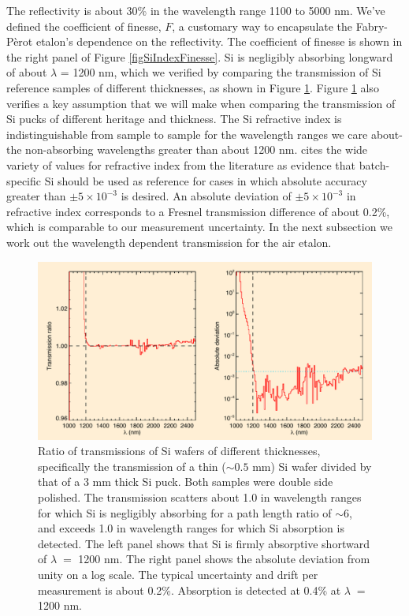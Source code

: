 \documentclass[osajnl,preprint,showpacs,superscriptaddress,12pt]{revtex4-1} %
\begin{document}
The reflectivity is about 30\% in the wavelength range 1100 to 5000 nm.  We've defined the coefficient of finesse\cite{2007fuph.book.....S}, $F$, a customary way to encapsulate the Fabry-P\`{e}rot etalon's dependence on the reflectivity.  The coefficient of finesse is shown in the right panel of Figure \ref{figSiIndexFinesse}.  Si is negligibly absorbing longward of about $\lambda$ = 1200 nm, which we verified by comparing the transmission of Si reference samples of different thicknesses, as shown in Figure \ref{figSiAbsorbfig}.  Figure \ref{figSiAbsorbfig} also verifies a key assumption that we will make when comparing the transmission of Si pucks of different heritage and thickness.  The Si refractive index is indistinguishable from sample to sample for the wavelength ranges we care about- the non-absorbing wavelengths greater than about 1200 nm.  \cite{2006SPIE.6273E..77F} cites the wide variety of values for refractive index from the literature as evidence that batch-specific Si should be used as reference for cases in which absolute accuracy greater than $\pm5\times10^{-3}$ is desired.  An absolute deviation of $\pm5\times10^{-3}$ in refractive index corresponds to a Fresnel transmission difference of about 0.2\%, which is comparable to our measurement uncertainty.  In the next subsection we work out the wavelength dependent transmission for the air etalon.

\begin{figure}[htbp]
\centerline{\includegraphics[width=0.95\columnwidth]{figs/fpAbsorbfig}}
\caption{Ratio of transmissions of Si wafers of different thicknesses, specifically the transmission of a thin ($\sim0.5$ mm) Si wafer divided by that of a 3 mm thick Si puck.  Both samples were double side polished.\label{figSiAbsorbfig}  The transmission scatters about 1.0 in wavelength ranges for which Si is negligibly absorbing for a path length ratio of $\sim$6, and exceeds 1.0 in wavelength ranges for which Si absorption is detected. The left panel shows that Si is firmly absorptive shortward of $\lambda \; =$ 1200 nm.  The right panel shows the absolute deviation from unity on a log scale.  The typical uncertainty and drift per measurement is about 0.2\%.  Absorption is detected at 0.4\% at $\lambda \;=$ 1200 nm.}
\end{figure}
\end{document}
